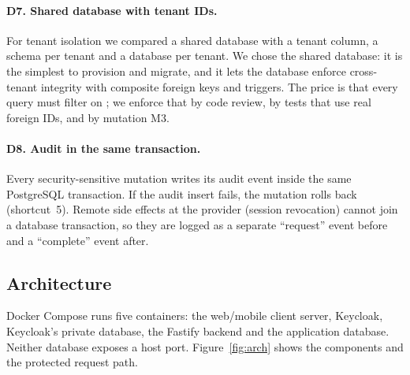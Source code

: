 \paragraph{D7. Shared database with tenant IDs.}
For tenant isolation we compared a shared database with a tenant column, a schema per tenant and a database per tenant. We chose the shared database: it is the simplest to provision and migrate, and it lets the database enforce cross-tenant integrity with composite foreign keys and triggers. The price is that every query must filter on ; we enforce that by code review, by tests that use real foreign IDs, and by mutation M3.

\paragraph{D8. Audit in the same transaction.}
Every security-sensitive mutation writes its audit event inside the same PostgreSQL transaction. If the audit insert fails, the mutation rolls back (shortcut~5). Remote side effects at the provider (session revocation) cannot join a database transaction, so they are logged as a separate ``request'' event before and a ``complete'' event after.

\subsection{Architecture}
Docker Compose runs five containers: the web/mobile client server, Keycloak, Keycloak's private database, the Fastify backend and the application database. Neither database exposes a host port. Figure~\ref{fig:arch} shows the components and the protected request path.

